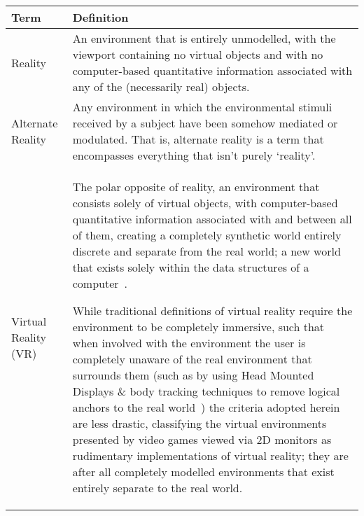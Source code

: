 \begin{center}
\begin{longtable}{ l p{10cm} }

\toprule

\textbf{Term} & \textbf{Definition} \\

\midrule

		
Reality & An environment that is entirely unmodelled, with the viewport containing no virtual objects and with no computer-based quantitative information associated with any of the (necessarily real) objects. \\
		
\midrule
		

Alternate Reality & Any environment in which the environmental stimuli received by a subject have been somehow mediated or modulated. That is, alternate reality is a term that encompasses everything that isn't purely `reality'. \\

\midrule
		
		
Virtual Reality (VR) & The polar opposite of reality, an environment that consists solely of virtual objects, with computer-based quantitative information associated with and between all of them, creating a completely synthetic world entirely discrete and separate from the real world; a new world that exists solely within the data structures of a computer~\cite{Milgram1994, Milgram1999, Want2009}.

While traditional definitions of virtual reality require the environment to be completely immersive, such that when involved with the environment the user is completely unaware of the real environment that surrounds them (such as by using Head Mounted Displays \& body tracking techniques to remove logical anchors to the real world~\cite{Druck2006}) the criteria adopted herein are less drastic, classifying the virtual environments presented by video games viewed via 2D monitors as rudimentary implementations of virtual reality; they are after all completely modelled environments that exist entirely separate to the real world. \\
		

\end{longtable}
\end{center}
